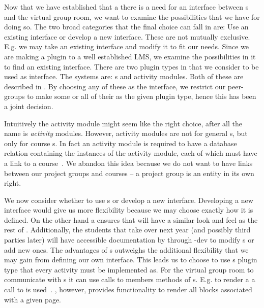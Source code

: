 Now that we have established that a there is a need for an interface between \detdeandrelaver[]s and the virtual group room, we want to examine the possibilities that we have for doing so.
The two broad categories that the final choice can fall in are: Use an existing interface or develop a new interface.
These are not mutually exclusive.
E.g. we may take an existing interface and modify it to fit our needs.
Since we are making a plugin to a well established LMS, we examine the possibilities in it to find an existing interface.
There are two plugin types in \moodle{} that we consider to be used as interface.
The systems are: \block{}s and activity modules.
Both of these are described in .
By choosing any of these as the interface, we restrict our peer-groups to make some or all of their \subsystem{} as the given plugin type, hence this has been a joint decision.

Intuitively the activity module might seem like the right choice, after all the name is \emph{activity} modules.
However, activity modules are not for general \detdeandrelaver[]s, but only for course \detdeandrelaver[]s.
In fact an activity module is required to have a database relation containing the instances of the activity module, each of which must have a link to a course~\cite{moodleactivitymodule}.
We abandon this idea because we do not want to have links between our project groups and courses -- a project group is an entity in its own right.

We now consider whether to use \block{}s or develop a new interface.
Developing a new interface would give us more flexibility because we may choose exactly how it is defined.
On the other hand a \block{} ensures that \system{} will have a similar look and feel as the rest of \moodle{}.
Additionally, the students that take over next year (and possibly third parties later) will have accessible documentation by through \moodle{}-dev to modify \detdeandrelaver[]s or add new ones.
The advantages of \block{}s outweighs the additional flexibility that we may gain from defining our own interface.
This leads us to choose to use \block{}s plugin type that every activity must be implemented as.
For the virtual group room to communicate with \detdeandrelaver[]s it can use calls to members methods of \block{}s.
E.g. to render a \block{} a call to  is used~\cite{moodleblockapp}.
\moodle{}, however, provides functionality to render all blocks associated with a given page.


